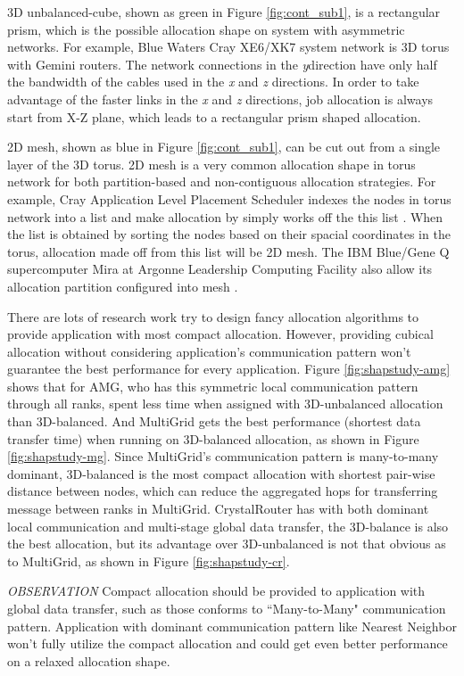 \documentclass[conference]{IEEEtran}
\begin{document}
3D unbalanced-cube, shown as green in Figure \ref{fig:cont_sub1}, is a rectangular prism, which is the possible allocation shape on system with asymmetric networks. For example, Blue Waters Cray XE6/XK7 system network is 3D torus with Gemini routers. The network connections in the \emph{y}direction have only half the bandwidth of the cables used in the \emph{x} and \emph{z} directions. In order to take advantage of the faster links in the \emph{x} and \emph{z} directions, job allocation is always start from X-Z plane, which leads to a rectangular prism shaped allocation\cite{RF}.

2D mesh, shown as blue in Figure \ref{fig:cont_sub1}, can be cut out from a single layer of the 3D torus. 2D mesh is a very common allocation shape in torus network for both partition-based and non-contiguous allocation strategies. For example, Cray Application Level Placement Scheduler indexes the nodes in torus network into a list and make allocation by simply works off the this list \cite{carl-cug}. When the list is obtained by sorting the nodes based on their spacial coordinates in the torus, allocation made off from this list will be 2D mesh. The IBM Blue/Gene Q supercomputer Mira at Argonne Leadership Computing Facility also allow its allocation partition configured into mesh \cite{zhou-ipdps}. 


There are lots of research work try to design fancy allocation algorithms to provide application with most compact allocation. However, providing cubical allocation without considering application's communication pattern won't guarantee the best performance for every application. Figure \ref{fig:shapstudy-amg} shows that for AMG, who has this symmetric local communication pattern through all ranks, spent less time when assigned with 3D-unbalanced allocation than 3D-balanced. And MultiGrid gets the best performance (shortest data transfer time) when running on 3D-balanced allocation, as shown in Figure \ref{fig:shapstudy-mg}. Since MultiGrid's communication pattern is many-to-many dominant, 3D-balanced is the most compact allocation with shortest pair-wise distance between nodes, which can reduce the aggregated hops for transferring message between ranks in MultiGrid. CrystalRouter has with both dominant local communication and multi-stage global data transfer, the 3D-balance is also the best allocation, but its advantage over 3D-unbalanced is not that obvious as to MultiGrid, as shown in Figure \ref{fig:shapstudy-cr}.

\emph{OBSERVATION}
Compact allocation should be provided to application with global data transfer, such as those conforms to ``Many-to-Many" communication pattern. Application with dominant communication pattern like Nearest Neighbor won't fully utilize the compact allocation and could get even better performance on a relaxed allocation shape. 
\end{document}
